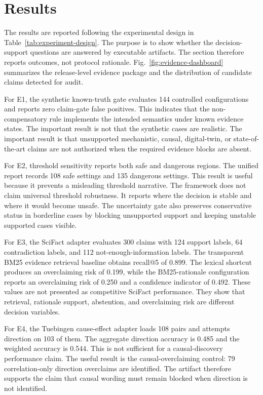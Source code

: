 \section{Results}
\label{sec:results}

The results are reported following the experimental design in Table~\ref{tab:experiment-design}. The purpose is to show whether the decision-support questions are answered by executable artifacts. The section therefore reports outcomes, not protocol rationale. Fig.~\ref{fig:evidence-dashboard} summarizes the release-level evidence package and the distribution of candidate claims detected for audit.



For E1, the synthetic known-truth gate evaluates 144 controlled configurations and reports zero claim-gate false positives. This indicates that the non-compensatory rule implements the intended semantics under known evidence states. The important result is not that the synthetic cases are realistic. The important result is that unsupported mechanistic, causal, digital-twin, or state-of-the-art claims are not authorized when the required evidence blocks are absent.

For E2, threshold sensitivity reports both safe and dangerous regions. The unified report records 108 safe settings and 135 dangerous settings. This result is useful because it prevents a misleading threshold narrative. The framework does not claim universal threshold robustness. It reports where the decision is stable and where it would become unsafe. The uncertainty gate also preserves conservative status in borderline cases by blocking unsupported support and keeping unstable supported cases visible.



For E3, the SciFact adapter evaluates 300 claims with 124 support labels, 64 contradiction labels, and 112 not-enough-information labels. The transparent BM25 evidence retrieval baseline obtains recall@5 of 0.899. The lexical shortcut produces an overclaiming risk of 0.199, while the BM25-rationale configuration reports an overclaiming risk of 0.250 and a confidence indicator of 0.492. These values are not presented as competitive SciFact performance. They show that retrieval, rationale support, abstention, and overclaiming risk are different decision variables.

For E4, the Tuebingen cause-effect adapter loads 108 pairs and attempts direction on 103 of them. The aggregate direction accuracy is 0.485 and the weighted accuracy is 0.544. This is not sufficient for a causal-discovery performance claim. The useful result is the causal-overclaiming control: 79 correlation-only direction overclaims are identified. The artifact therefore supports the claim that causal wording must remain blocked when direction is not identified.

